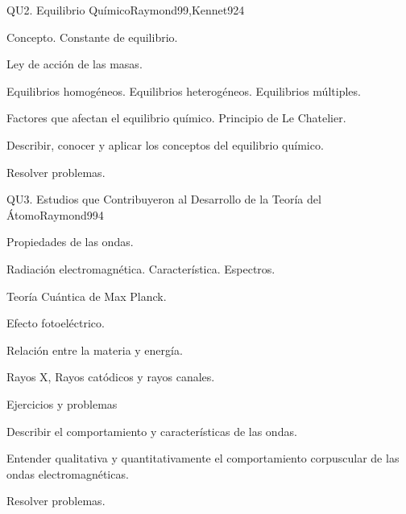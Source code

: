 \begin{syllabus}
\begin{unit}{QU2. Equilibrio Químico}{Raymond99,Kennet92}{4}
\begin{topics}
      \item Concepto. Constante de equilibrio.
      \item Ley de acción de las masas.
      \item Equilibrios homogéneos. Equilibrios heterogéneos. Equilibrios múltiples.
      \item Factores que afectan el equilibrio químico. Principio de Le Chatelier.
    \end{topics}
   \begin{learningoutcomes}
      \item Describir, conocer y aplicar los conceptos del equilibrio químico.
      \item Resolver problemas.
   \end{learningoutcomes}
\end{unit}

\begin{unit}{QU3. Estudios que Contribuyeron al Desarrollo de la Teoría del Átomo}{Raymond99}{4}
\begin{topics}
      \item Propiedades de las ondas.
      \item Radiación electromagnética. Característica. Espectros.
      \item Teoría Cuántica de Max Planck.
      \item Efecto fotoeléctrico.
      \item Relación entre la materia y energía.
      \item Rayos X, Rayos catódicos y rayos canales.
      \item Ejercicios y problemas
\end{topics}

   \begin{learningoutcomes}
      \item Describir el comportamiento y características de las ondas.
      \item Entender qualitativa y quantitativamente el comportamiento corpuscular de las ondas electromagnéticas.
      \item Resolver problemas.
   \end{learningoutcomes}
\end{unit}


\end{syllabus}
